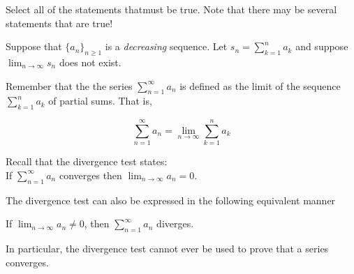 \documentclass{ximera}
\author{Jim Talamo and Jason Miller}
\begin{document}
\begin{exercise}

Select all of the statements thatmust be true.  Note that there may be several statements that are true! 

 Suppose that $\displaystyle\{a_n\}_{n \geq 1}$ is a \emph{decreasing} sequence.  Let $s_n =\displaystyle  \sum^n_{k=1} a_k$ and suppose $\displaystyle \lim_{n \rightarrow \infty} s_n$ does  not exist.


\begin{selectAll}
\end{selectAll}

\begin{hint}
Remember that the the series $\sum^{\infty}_{n=1} a_n$ is defined as the limit of the sequence $\sum^{n}_{k=1} a_k$ of partial sums. That is, 

\[
\sum^{\infty}_{n=1} a_n = \lim_{n \to \infty} \sum^n_{k=1} a_k
\]
\end{hint}


\begin{hint}
Recall that the divergence test states: \\
If $\sum^{\infty}_{n=1} a_n $ converges then $\lim_{n \to \infty} a_n=0$. 

The divergence test can also be expressed in the following equivalent manner

If $\lim_{n \to \infty} a_n \neq 0$, then $\sum^{\infty}_{n=1} a_n$ diverges. 

In particular, the divergence test cannot ever be used to prove that a series converges.
\end{hint}





\end{exercise}
\end{document}
